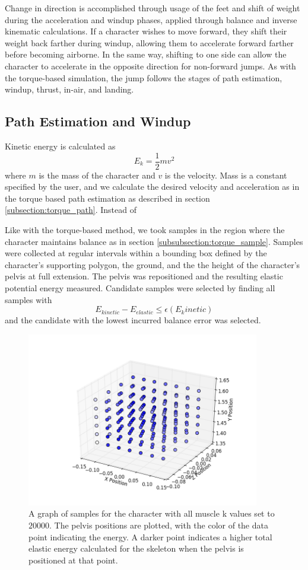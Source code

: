 Change in direction is accomplished through usage of the feet and shift of weight during the acceleration and windup phases, applied through balance and inverse kinematic calculations.  If a character wishes to move forward, they shift their weight back farther during windup, allowing them to accelerate forward farther before becoming airborne.  In the same way, shifting to one side can allow the character to accelerate in the opposite direction for non-forward jumps.  As with the torque-based simulation, the jump follows the stages of path estimation, windup, thrust, in-air, and landing.

\subsection{Path Estimation and Windup}
\label{subsection:energy_path}
Kinetic energy is calculated as \[ E_k = \frac{1}{2} m v^2 \] where $m$ is the mass of the character and $v$ is the velocity.  Mass is a constant specified by the user, and we calculate the desired velocity and acceleration as in the torque based path estimation as described in section \ref{subsection:torque_path}.  Instead of 

Like with the torque-based method, we took samples in the region where the character maintains balance as in section \ref{subsubsection:torque_sample}.  Samples were collected at regular intervals within a bounding box defined by the character's supporting polygon, the ground, and the the height of the character's pelvis at full extension.  The pelvis was repositioned and the resulting elastic potential energy measured.  Candidate samples were selected by finding all samples with \[ E_{kinetic} - E_{elastic} \le \epsilon(E_kinetic)\] and the candidate with the lowest incurred balance error was selected.

\begin{figure}[ht]
	\centering
	\includegraphics[width=4in]{images/K200000_global_dense.png}
	\caption[A plot of a sample field for energy based simulation]{A graph of samples for the character with all muscle k values set to $20000$.  The pelvis positions are plotted, with the color of the data point indicating the energy.  A darker point indicates a higher total elastic energy calculated for the skeleton when the pelvis is positioned at that point.}
	\label{fig:energy_samples}
\end{figure}


